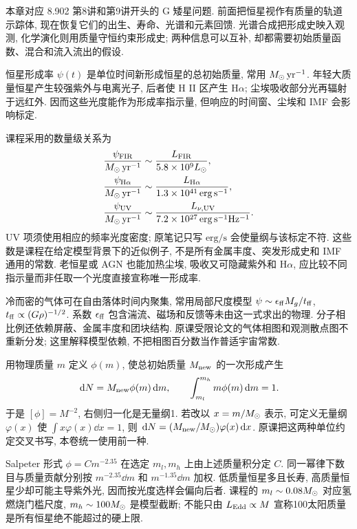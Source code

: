 
本章对应 8.902 第8讲和第9讲开头的 G 矮星问题. 前面把恒星视作有质量的轨道示踪体, 现在恢复它们的出生、寿命、光谱和元素回馈. 光谱合成把形成史映入观测, 化学演化则用质量守恒约束形成史; 两种信息可以互补, 却都需要初始质量函数、混合和流入流出的假设.

恒星形成率 $\psi(t)$ 是单位时间新形成恒星的总初始质量, 常用 $M_{\odot}\,\mathrm{yr^{-1}}$. 年轻大质量恒星产生较强紫外与电离光子, 后者使 H II 区产生 H$\alpha$; 尘埃吸收部分光再辐射于远红外. 因而这些光度能作为形成率指示量, 但响应的时间窗、尘埃和 IMF 会影响标定.

课程采用的数量级关系为
\begin{align*}
\frac{\psi_{\rm FIR}}{M_{\odot}\,\mathrm{yr^{-1}}}&\sim\frac{L_{\rm FIR}}{5.8\times10^9L_{\odot}},\\
\frac{\psi_{\rm H\alpha}}{M_{\odot}\,\mathrm{yr^{-1}}}&\sim\frac{L_{\rm H\alpha}}{1.3\times10^{41}\,\mathrm{erg\,s^{-1}}},\\
\frac{\psi_{\rm UV}}{M_{\odot}\,\mathrm{yr^{-1}}}&\sim\frac{L_{\nu,\rm UV}}{7.2\times10^{27}\,\mathrm{erg\,s^{-1}Hz^{-1}}}.
\end{align*}
UV 项须使用相应的频率光度密度; 原笔记只写 $\mathrm{erg/s}$ 会使量纲与该标定不符. 这些数是课程在给定模型背景下的近似例子, 不是所有金属丰度、突发形成史和 IMF 通用的常数. 老恒星或 AGN 也能加热尘埃, 吸收又可隐藏紫外和 H$\alpha$, 应比较不同指示量而非任取一个光度直接宣称唯一形成率.

冷而密的气体可在自由落体时间内聚集, 常用局部尺度模型 $\psi\sim\epsilon_{\rm ff}M_g/t_{\rm ff}$, $t_{\rm ff}\propto(G\rho)^{-1/2}$. 系数 $\epsilon_{\rm ff}$ 包含湍流、磁场和反馈等未由这一式求出的物理. 分子相比例还依赖屏蔽、金属丰度和团块结构. 原课受限论文的气体相图和观测散点图不重新分发; 这里解释模型依赖, 不把相图百分数当作普适宇宙常数.

用物理质量 $m$ 定义 $\phi(m)$, 使总初始质量 $M_{\rm new}$ 的一次形成产生
\[
\,\mathrm d N=M_{\rm new}\phi(m)\,\mathrm d m,\qquad
\int_{m_l}^{m_h}m\phi(m)\,\mathrm d m=1.
\]
于是 $[\phi]=M^{-2}$, 右侧归一化是无量纲1. 若改以 $x=m/M_{\odot}$ 表示, 可定义无量纲 $\varphi(x)$ 使 $\int x\varphi(x)\dd x=1$, 则 $\,\mathrm d N=(M_{\rm new}/M_{\odot})\varphi(x)\,\mathrm d x$. 原课把这两种单位约定交叉书写, 本卷统一使用前一种.

Salpeter 形式 $\phi=Cm^{-2.35}$ 在选定 $m_l,m_h$ 上由上述质量积分定 $C$. 同一幂律下数目与质量贡献分别按 $m^{-2.35}\dd m$ 和 $m^{-1.35}\dd m$ 加权. 低质量恒星多且长寿, 高质量恒星少却可能主导紫外光, 因而按光度选样会偏向后者. 课程的 $m_l\sim0.08M_{\odot}$ 对应氢燃烧门槛尺度, $m_h\sim100M_{\odot}$ 是模型截断; 不能只由 $L_{\rm Edd}\propto M$ 宣称100太阳质量是所有恒星绝不能超过的硬上限.


